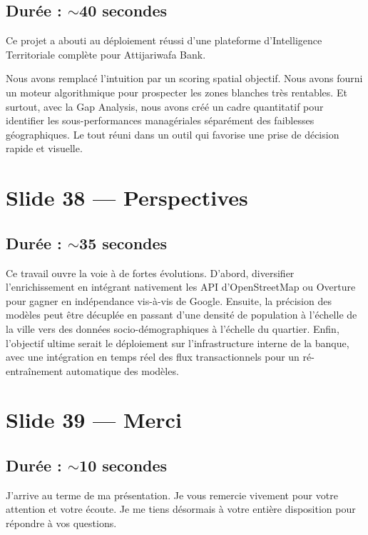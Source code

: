\documentclass[11pt,a4paper]{article}
\begin{document}
\subsection{Durée : $\sim$40 secondes}
Ce projet a abouti au déploiement réussi d'une plateforme d'Intelligence Territoriale complète pour Attijariwafa Bank. 

Nous avons remplacé l'intuition par un scoring spatial objectif. Nous avons fourni un moteur algorithmique pour prospecter les zones blanches très rentables. Et surtout, avec la Gap Analysis, nous avons créé un cadre quantitatif pour identifier les sous-performances managériales séparément des faiblesses géographiques. Le tout réuni dans un outil qui favorise une prise de décision rapide et visuelle.

\section{Slide 38 --- Perspectives}
\subsection{Durée : $\sim$35 secondes}
Ce travail ouvre la voie à de fortes évolutions. 
D'abord, diversifier l'enrichissement en intégrant nativement les API d'OpenStreetMap ou Overture pour gagner en indépendance vis-à-vis de Google. Ensuite, la précision des modèles peut être décuplée en passant d'une densité de population à l'échelle de la ville vers des données socio-démographiques à l'échelle du quartier. Enfin, l'objectif ultime serait le déploiement sur l'infrastructure interne de la banque, avec une intégration en temps réel des flux transactionnels pour un ré-entraînement automatique des modèles.

\section{Slide 39 --- Merci}
\subsection{Durée : $\sim$10 secondes}
J'arrive au terme de ma présentation. Je vous remercie vivement pour votre attention et votre écoute. Je me tiens désormais à votre entière disposition pour répondre à vos questions.
\end{document}
